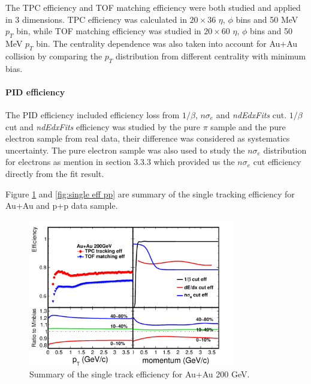 The TPC efficiency and TOF matching efficiency were both studied and
applied in 3 dimensions. TPC efficiency was calculated in $20\times36$
$\eta$, $\phi$ bins and 50 MeV $p_{T}$ bin, while TOF matching
efficiency was studied in $20\times60$ $\eta$, $\phi$ bins and
50 MeV $p_{T}$ bin. The centrality dependence was also taken into
account for Au+Au collision by comparing the $p_{T}$ distribution
from different centrality with minimum bias.


\paragraph{PID efficiency}

The PID efficiency included efficiency loss from $1/\beta$, $n\sigma_{e}$
and \emph{ndEdxFits }cut. $1/\beta$ cut and \emph{ndEdxFits} efficiency
was studied by the pure $\pi$ sample and the pure electron sample
from real data, their difference was considered as systematics uncertainty.
The pure electron sample was also used to study the $n\sigma_{e}$
distribution for electrons as mention in section 3.3.3 which provided
us the $n\sigma_{e}$ cut efficiency directly from the fit result. 

Figure \ref{fig:single eff AuAu} and \ref{fig:single eff pp} are
summary of the single tracking efficiency for Au+Au and p+p data sample.

\begin{figure}
\begin{centering}
\includegraphics[width=0.8\textwidth]{fig/3.Analysis/Efficiency/single_eff_AuAu}
\par\end{centering}

\protect\caption{Summary of the single track efficiency for Au+Au 200 GeV.}


\label{fig:single eff AuAu}
\end{figure}


